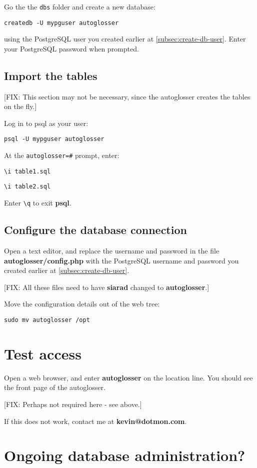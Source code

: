 \documentclass[a4paper,10pt]{article}
\begin{document}
Go the the \texttt{dbs} folder and create a new database:

\texttt{createdb -U mypguser autoglosser}

using the PostgreSQL user you created earlier at \ref{subsec:create-db-user}.  Enter your PostgreSQL password when prompted.

\subsection{Import the tables}

[FIX: This section may not be necessary, since the autoglosser creates the tables on the fly.]

Log in to psql as your user:

\texttt{psql -U mypguser autoglosser}

At the \verb|autoglosser=#| prompt, enter:

\verb|\i table1.sql|

\verb|\i table2.sql|

Enter \verb|\q| to exit \textbf{psql}.

\subsection{Configure the database connection}

Open a text editor, and replace the username and password in the file \textbf{autoglosser/config.php} with the PostgreSQL username and password you created earlier at \ref{subsec:create-db-user}.

[FIX: All these files need to have \textbf{siarad} changed to \textbf{autoglosser}.]

Move the configuration details out of the web tree:

\texttt{sudo mv autoglosser /opt}

\section{Test access}

Open a web browser, and enter \textbf{autoglosser} on the location line.  You should see the front page of the autoglosser.

[FIX: Perhaps not required here - see above.]

If this does not work, contact me at \textbf{kevin@dotmon.com}.

\section{Ongoing database administration?}
\end{document}
